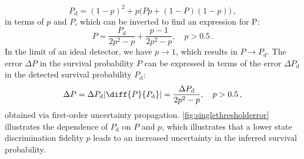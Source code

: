 \documentclass[../Thesis-IJspeert.tex]{subfiles}
\begin{document}
\begin{equation}
P_\mathrm{d}=  (1-p)^2 + p\big(Pp + (1-P)(1-p) \big)\,,
\end{equation}
in terms of $p$ and $P$, which can be inverted to find an expression for P:
\begin{equation}
P = \frac{P_\mathrm{d}}{2p^2-p} + \frac{p-1}{2p^2-p},\hspace{1em} p > 0.5\,.
\end{equation}
In the limit of an ideal detector, we have $p\rightarrow 1$, which results in $P\rightarrow P_d$. The error $\Delta P$ in the survival probability $P$ can be expressed in terms of the error $\Delta P_\mathrm{d}$ in the detected survival probability $P_\mathrm{d}$:
\begin{equation}
\Delta P = \Delta P_\mathrm{d} \left| \diff{P}{P_\mathrm{d}} \right|=\frac{\Delta P_\mathrm{d}}{2p^2-p},\hspace{1em} p > 0.5\,,
\end{equation}
obtained via first-order uncertainty propagation. \autoref{fig:singlethresholderror} illustrates the dependence of $P_\mathrm{d}$ on $P$ and $p$, which illustrates that a lower state discrimination fidelity $p$ leads to an increased uncertainty in the inferred survival probability.
\end{document}
